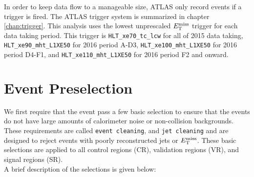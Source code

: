 \indent In order to keep data flow to a manageable size, ATLAS only record events if a trigger is fired.  The ATLAS trigger system is summarized in chapter \ref{chap:trigger}.  This analysis uses the lowest unprescaled $E_{\mathrm{T}}^{\mathrm{miss}}$ trigger for each data taking period.  This trigger is {\tt HLT\_xe70\_tc\_lcw} for all of 2015 data taking, \verb+HLT_xe90_mht_L1XE50+ for 2016 period A-D3, \verb+HLT_xe100_mht_L1XE50+ for 2016 period D4-F1, and \verb+HLT_xe110_mht_L1XE50+ for 2016 period F2 and onward. \\

\chapter{Event Preselection}
\label{sec:Selection_EventPreselection}

\indent We first require that the event pass a few basic selection to ensure that the events do not have large amounts of calorimeter noise or non-collision backgrounds.  These requirements are called {\tt event cleaning}, and {\tt jet cleaning} and are designed to reject events with poorly reconstructed jets or $E_{\mathrm{T}}^{\mathrm{miss}}$.  These basic selections are applied to all control regions (CR), validation regions (VR), and signal regions (SR).  \\

\indent A brief description of the selections is given below: \\

